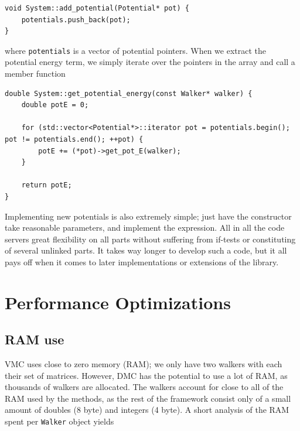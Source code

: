 \vspace{0.5cm}
\begin{lstlisting}
void System::add_potential(Potential* pot) {
    potentials.push_back(pot);
}
\end{lstlisting}

where \verb+potentials+ is a vector of potential pointers. When we extract the potential energy term, we simply iterate over the pointers in the array and call a member function

\vspace{0.5cm}
\begin{lstlisting}
double System::get_potential_energy(const Walker* walker) {
    double potE = 0;

    for (std::vector<Potential*>::iterator pot = potentials.begin(); pot != potentials.end(); ++pot) {
        potE += (*pot)->get_pot_E(walker);
    }

    return potE;
}
\end{lstlisting}

Implementing new potentials is also extremely simple; just have the constructor take reasonable parameters, and implement the expression. All in all the code servers great flexibility on all parts without suffering from if-tests or constituting of several unlinked parts. It takes way longer to develop such a code, but it all pays off when it comes to later implementations or extensions of the library.

\section{Performance Optimizations}

\subsection{RAM use}

VMC uses close to zero memory (RAM); we only have two walkers with each their set of matrices. However, DMC has the potential to use a lot of RAM, as thousands of walkers are allocated. The walkers account for close to all of the RAM used by the methods, as the rest of the framework consist only of a small amount of doubles (8 byte) and integers (4 byte). A short analysis of the RAM spent per \verb+Walker+ object yields

